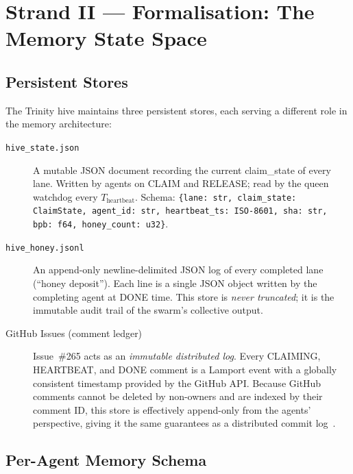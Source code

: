 \section{Strand II --- Formalisation: The Memory State Space}
\label{sec:K-formalisation}

\subsection{Persistent Stores}
\label{ssec:K-persistent-stores}

The Trinity hive maintains three persistent stores, each serving a
different role in the memory architecture:

\begin{description}
  \item[\texttt{hive\_state.json}] A mutable JSON document recording the
    current claim\_state of every lane. Written by agents on CLAIM and
    RELEASE; read by the queen watchdog every $T_{\text{heartbeat}}$.
    Schema: \texttt{\{lane: str, claim\_state: ClaimState, agent\_id: str,
    heartbeat\_ts: ISO-8601, sha: str, bpb: f64, honey\_count: u32\}}.

  \item[\texttt{hive\_honey.jsonl}] An append-only newline-delimited JSON
    log of every completed lane (``honey deposit''). Each line is a
    single JSON object written by the completing agent at DONE time.
    This store is \emph{never truncated}; it is the immutable audit
    trail of the swarm's collective output.

  \item[GitHub Issues (comment ledger)] Issue~\#265 acts as an
    \emph{immutable distributed log}. Every CLAIMING, HEARTBEAT, and
    DONE comment is a Lamport event with a globally consistent
    timestamp provided by the GitHub API. Because GitHub comments
    cannot be deleted by non-owners and are indexed by their comment
    ID, this store is effectively append-only from the agents'
    perspective, giving it the same guarantees as a distributed
    commit log~\cite{lamport_time_clocks}.
\end{description}

\subsection{Per-Agent Memory Schema}
\label{ssec:K-per-agent-schema}

